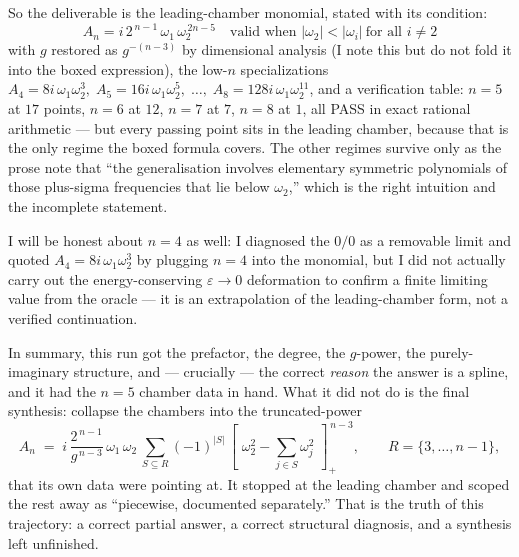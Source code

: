 \documentclass{article}
\newcommand{\pp}[1]{\left[\,#1\,\right]_{+}}
\begin{document}
So the deliverable is the leading-chamber monomial, stated with its condition:
\[
\boxed{\;A_n=i\,2^{\,n-1}\,\omega_1\,\omega_2^{\,2n-5}\quad
\text{valid when }|\omega_2|<|\omega_i|\ \text{for all }i\neq2\;}
\]
with $g$ restored as $g^{-(n-3)}$ by dimensional analysis (I note this but do not
fold it into the boxed expression), the low-$n$ specializations
$A_4=8i\,\omega_1\omega_2^3,\;A_5=16i\,\omega_1\omega_2^5,\;\dots,\;
A_8=128i\,\omega_1\omega_2^{11}$, and a verification table: $n=5$ at $17$ points,
$n=6$ at $12$, $n=7$ at $7$, $n=8$ at $1$, all PASS in exact rational arithmetic
--- but every passing point sits in the leading chamber, because that is the only
regime the boxed formula covers. The other regimes survive only as the prose
note that ``the generalisation involves elementary symmetric polynomials of those
plus-sigma frequencies that lie below $\omega_2$,'' which is the right intuition
and the incomplete statement.

I will be honest about $n=4$ as well: I diagnosed the $0/0$ as a removable
limit and quoted $A_4=8i\,\omega_1\omega_2^3$ by plugging $n=4$ into the monomial,
but I did not actually carry out the energy-conserving $\varepsilon\to0$
deformation to confirm a finite limiting value from the oracle --- it is an
extrapolation of the leading-chamber form, not a verified continuation.

In summary, this run got the prefactor, the degree, the $g$-power, the
purely-imaginary structure, and --- crucially --- the correct \emph{reason} the
answer is a spline, and it had the $n=5$ chamber data in hand. What it did not do
is the final synthesis: collapse the chambers into the truncated-power
\[
A_n \;=\; i\,\frac{2^{\,n-1}}{g^{\,n-3}}\,\omega_1\,\omega_2\,
\sum_{S\subseteq R}(-1)^{|S|}\,
\pp{\,\omega_2^2-\textstyle\sum_{j\in S}\omega_j^2\,}^{\,n-3},
\qquad R=\{3,\dots,n-1\},
\]
that its own data were pointing at. It stopped at the leading chamber and scoped
the rest away as ``piecewise, documented separately.'' That is the truth of this
trajectory: a correct partial answer, a correct structural diagnosis, and a
synthesis left unfinished.
\end{document}
